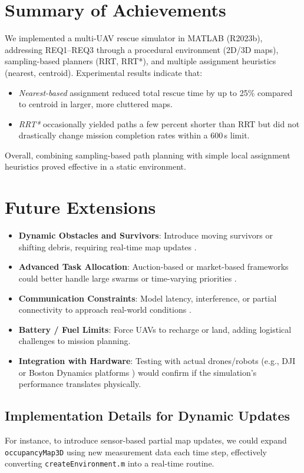 \documentclass[12pt,a4paper]{report}
\begin{document}
\section{Summary of Achievements}
We implemented a multi-UAV rescue simulator in MATLAB (R2023b), addressing REQ1–REQ3 through
a procedural environment (2D/3D maps), sampling-based planners (RRT, RRT*), and multiple
assignment heuristics (nearest, centroid). Experimental results indicate that:
\begin{itemize}
   \item \emph{Nearest-based} assignment reduced total rescue time by up to 25\% compared 
   to centroid in larger, more cluttered maps.
   \item \emph{RRT*} occasionally yielded paths a few percent shorter than RRT but 
   did not drastically change mission completion rates within a 600\,s limit.
\end{itemize}
Overall, combining sampling-based path planning with simple local assignment heuristics
proved effective in a static environment.

\section{Future Extensions}
\begin{itemize}
  \item \textbf{Dynamic Obstacles and Survivors}: Introduce moving survivors or
  shifting debris, requiring real-time map updates \cite{Oleynikova2018ReplanDynamic}.
  \item \textbf{Advanced Task Allocation}: Auction-based or market-based frameworks
  could better handle large swarms or time-varying priorities \cite{Dias2006MarketBased,Gerkey2002SoldAuction}.
  \item \textbf{Communication Constraints}: Model latency, interference, or partial
  connectivity to approach real-world conditions \cite{Dias2006MarketBased}.
  \item \textbf{Battery / Fuel Limits}: Force UAVs to recharge or land, adding logistical
  challenges to mission planning.
  \item \textbf{Integration with Hardware}: Testing with actual drones/robots 
  (e.g., DJI or Boston Dynamics platforms \cite{Clothier2015UVWSafetyCase,Sharma2010CooperativeUAV}) 
  would confirm if the simulation’s performance translates physically.
\end{itemize}

\subsection*{Implementation Details for Dynamic Updates}
For instance, to introduce sensor-based partial map updates, we could expand 
\texttt{occupancyMap3D} using new measurement data each time step, effectively 
converting \texttt{createEnvironment.m} into a real-time routine.
\end{document}
